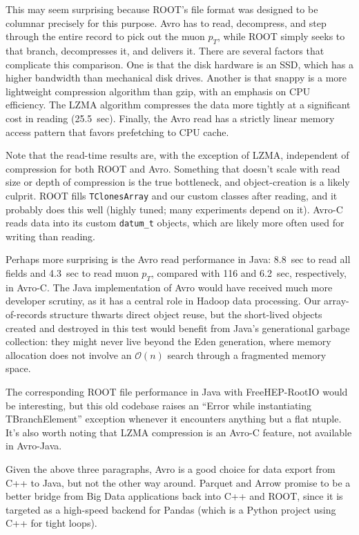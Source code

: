 \documentclass{article}
\begin{document}
This may seem surprising because ROOT's file format was designed to be columnar precisely for this purpose. Avro has to read, decompress, and step through the entire record to pick out the muon $p_T$, while ROOT simply seeks to that branch, decompresses it, and delivers it. There are several factors that complicate this comparison. One is that the disk hardware is an SSD, which has a higher bandwidth than mechanical disk drives. Another is that snappy is a more lightweight compression algorithm than gzip, with an emphasis on CPU efficiency. The LZMA algorithm compresses the data more tightly at a significant cost in reading (25.5~sec). Finally, the Avro read has a strictly linear memory access pattern that favors prefetching to CPU cache.

Note that the read-time results are, with the exception of LZMA, independent of compression for both ROOT and Avro. Something that doesn't scale with read size or depth of compression is the true bottleneck, and object-creation is a likely culprit. ROOT fills {\tt TClonesArray} and our custom classes after reading, and it probably does this well (highly tuned; many experiments depend on it). Avro-C reads data into its custom {\tt datum\_t} objects, which are likely more often used for writing than reading.

Perhaps more surprising is the Avro read performance in Java: 8.8~sec to read all fields and 4.3~sec to read muon $p_T$, compared with 116 and 6.2~sec, respectively, in Avro-C. The Java implementation of Avro would have received much more developer scrutiny, as it has a central role in Hadoop data processing. Our array-of-records structure thwarts direct object reuse, but the short-lived objects created and destroyed in this test would benefit from Java's generational garbage collection: they might never live beyond the Eden generation, where memory allocation does not involve an $\mathcal{O}(n)$ search through a fragmented memory space.

The corresponding ROOT file performance in Java with FreeHEP-RootIO would be interesting, but this old codebase raises an ``Error while instantiating TBranchElement'' exception whenever it encounters anything but a flat ntuple. It's also worth noting that LZMA compression is an Avro-C feature, not available in Avro-Java.

Given the above three paragraphs, Avro is a good choice for data export from C++ to Java, but not the other way around. Parquet and Arrow promise to be a better bridge from Big Data applications back into C++ and ROOT, since it is targeted as a high-speed backend for Pandas (which is a Python project using C++ for tight loops).
\end{document}

